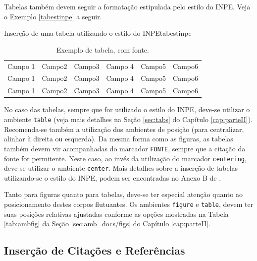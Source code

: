Tabelas também devem seguir a formatação estipulada pelo estilo do INPE. Veja o Exemplo \ref{tabestinpe} a seguir.

\begin{texexptitled}[breakable,center lower,enhanced,middle=2mm,listing and text]{Inserção de uma tabela utilizando o estilo do INPE}{tabestinpe}
\begin{table}[H] %
\begin{center} %
\caption{Exemplo de tabela, com fonte.}
\begin{tabular}{l|l|c|c|r|r}
\hline %
Campo 1 & Campo2 & Campo3 & Campo 4 & Campo5 & Campo6 \\
Campo 1 & Campo2 & Campo3 & Campo 4 & Campo5 & Campo6 \\
Campo 1 & Campo2 & Campo3 & Campo 4 & Campo5 & Campo6 \\
\hline %
\end{tabular}
\end{center}
\end{table}
\end{texexptitled}

No caso das tabelas, sempre que for utilizado o estilo do INPE, deve-se utilizar o ambiente {\tt table} (veja mais detalhes na Seção \ref{sec:tabs} do Capítulo \ref{cap:parteII}). Recomenda-se também a utilização dos ambientes de posição (para centralizar, alinhar à direita ou esquerda). Da mesma forma como as figuras, as tabelas também devem vir acompanhadas do marcador {\tt FONTE}, sempre que a citação da fonte for permitente. Neste caso, ao invés da utilização do marcador {\tt centering}, deve-se utilizar o ambiente {\tt center}. Mais detalhes sobre a inserção de tabelas utilizando-se o estilo do INPE, podem ser encontradas no Anexo B de .

Tanto para figuras quanto para tabelas, deve-se ter especial atenção quanto ao posicionamento destes corpos flutuantes. Os ambientes {\tt figure} e {\tt table}, devem ter suas posições relativas ajustadas conforme as opções mostradas na Tabela \ref{tab:ambfig} da Seção \ref{sec:amb_docs/figs} do Capítulo \ref{cap:parteII}.

\subsection{Inserção de Citações e Referências}
\label{sec:citerefs}


